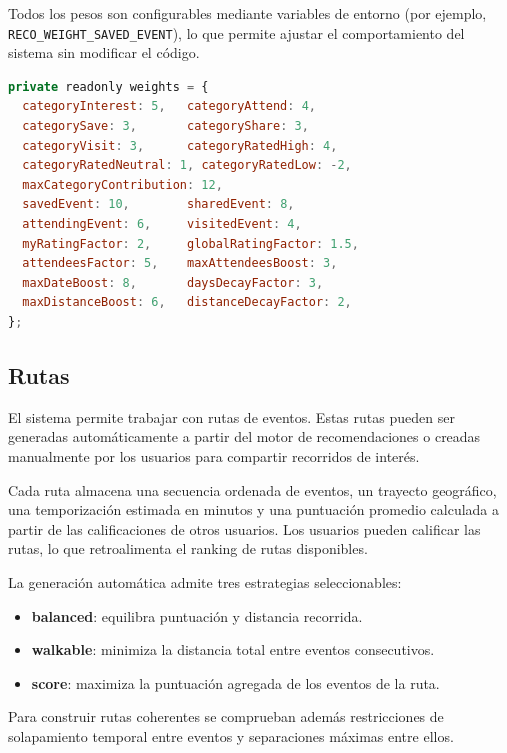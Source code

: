Todos los pesos son configurables mediante variables de entorno (por ejemplo, \texttt{RECO\_WEIGHT\_SAVED\_EVENT}), lo que permite ajustar el comportamiento del sistema sin modificar el código.

\begin{lstlisting}[language=JavaScript, caption={Pesos del sistema de recomendaciones (valores por defecto)}]
private readonly weights = {
  categoryInterest: 5,   categoryAttend: 4,
  categorySave: 3,       categoryShare: 3,
  categoryVisit: 3,      categoryRatedHigh: 4,
  categoryRatedNeutral: 1, categoryRatedLow: -2,
  maxCategoryContribution: 12,
  savedEvent: 10,        sharedEvent: 8,
  attendingEvent: 6,     visitedEvent: 4,
  myRatingFactor: 2,     globalRatingFactor: 1.5,
  attendeesFactor: 5,    maxAttendeesBoost: 3,
  maxDateBoost: 8,       daysDecayFactor: 3,
  maxDistanceBoost: 6,   distanceDecayFactor: 2,
};
\end{lstlisting}

\subsection{Rutas}

El sistema permite trabajar con rutas de eventos. Estas rutas pueden ser generadas automáticamente a partir del motor de recomendaciones o creadas manualmente por los usuarios para compartir recorridos de interés.

Cada ruta almacena una secuencia ordenada de eventos, un trayecto geográfico, una temporización estimada en minutos y una puntuación promedio calculada a partir de las calificaciones de otros usuarios. Los usuarios pueden calificar las rutas, lo que retroalimenta el ranking de rutas disponibles.

La generación automática admite tres estrategias seleccionables:

\begin{itemize}
    \item \textbf{balanced}: equilibra puntuación y distancia recorrida.
    \item \textbf{walkable}: minimiza la distancia total entre eventos consecutivos.
    \item \textbf{score}: maximiza la puntuación agregada de los eventos de la ruta.
\end{itemize}

Para construir rutas coherentes se comprueban además restricciones de solapamiento temporal entre eventos y separaciones máximas entre ellos.

